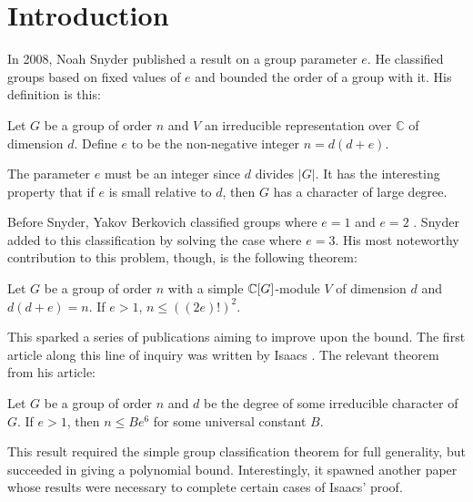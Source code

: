 \documentclass[main.tex]{subfiles}
\begin{document}
\chapter{Introduction}

In 2008, Noah Snyder published \cite{snyderarticle} a result on a group parameter $e$. He classified groups based on fixed values of $e$ and bounded the order of a group with it. His definition is this:

\hss

\begin{definition}
Let $G$ be a group of order $n$ and $V$ an irreducible representation over $\mathbb{C}$ of dimension $d$. Define $e$ to be the non-negative integer $n = d(d + e)$.
\end{definition}

\hss

The parameter $e$ must be an integer since $d$ divides $|G|$. It has the interesting property that if $e$ is small relative to $d$, then $G$ has a character of large degree.

Before Snyder, Yakov Berkovich classified groups where $e=1$ and $e=2$ \cite{berkovicharticle}. Snyder added to this classification by solving the case where $e=3$. His most noteworthy contribution to this problem, though, is the following theorem:

\hss

\begin{theorem}
Let $G$ be a group of order $n$ with a simple $\mathbb{C}[G]$-module $V$ of dimension $d$ and $d(d+e) = n$. If $e > 1$, $n \le ((2e)!)^2$.
\end{theorem}

\hss

This sparked a series of publications aiming to improve upon the bound. The first article along this line of inquiry was written by Isaacs \cite{isaacsarticle}. The relevant theorem from his article:

\hss

\begin{theorem} Let $G$ be a group of order $n$ and $d$ be the degree of some irreducible character of $G$. If $e > 1$, then $n \le Be^6$ for some universal constant $B$.
\end{theorem}

\hss

This result required the simple group classification theorem for full generality, but succeeded in giving a polynomial bound. Interestingly, it spawned another paper \cite{larsenmalletieparticle} whose results were necessary to complete certain cases of Isaacs' proof.
\end{document}
